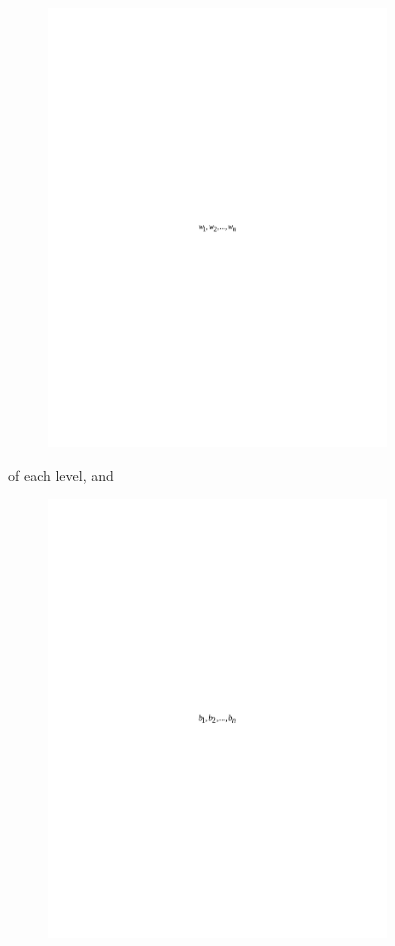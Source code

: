 \begin{figure}[H]
	\centering
	\includegraphics[width=0.8\textwidth]{media/ict/image42}
	\caption*{}
\end{figure}

of each level, and
\begin{figure}[H]
	\centering
	\includegraphics[width=0.8\textwidth]{media/ict/image43}
	\caption*{}
\end{figure}

